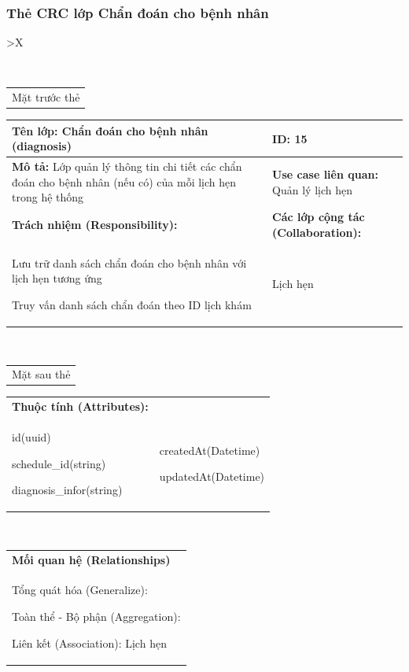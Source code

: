 \subsubsection{Thẻ CRC lớp Chẩn đoán cho bệnh nhân}

\begin{xltabular}{\textwidth}{
		>{\centering\arraybackslash}X
	}
	\caption{\bfseries \fontsize{12pt}{0pt}\selectfont Thẻ CRC lớp Chẩn đoán cho bệnh nhân}
	\\
	\begin{tabularx}{0.9\textwidth}{X}
		Mặt trước thẻ
	\end{tabularx}
	\begin{tabularx}{0.9\textwidth}{|X|X|}
		\hline
		\textbf{Tên lớp:} Chẩn đoán cho bệnh nhân (diagnosis)                                                               & \textbf{ID:} 15                                \\
		\hline
		\textbf{Mô tả:} Lớp quản lý thông tin chi tiết các chẩn đoán cho bệnh nhân (nếu có) của mỗi lịch hẹn trong hệ thống & \textbf{Use case liên quan:}  Quản lý lịch hẹn \\
		\hline
		\textbf{Trách nhiệm (Responsibility):}                                                                              & \textbf{Các lớp cộng tác (Collaboration):}     \\
		Lưu trữ danh sách chẩn đoán cho bệnh nhân với lịch hẹn tương ứng

		Truy vấn danh sách chẩn đoán theo ID lịch khám
		                                                                                                                    &
		Lịch hẹn
		\\
		\hline
	\end{tabularx}
	\\
	\begin{tabularx}{0.9\textwidth}{X}
		Mặt sau thẻ
	\end{tabularx}
	\begin{tabularx}{0.9\textwidth}{|X|X|}
		\hline
		\textbf{Thuộc tính (Attributes):} & \\
		id(uuid)

		schedule\_id(string)

		diagnosis\_infor(string)
		                                  &
		createdAt(Datetime)

		updatedAt(Datetime)
		\\ \hline
	\end{tabularx}
	\\
	\begin{tabularx}{0.9\textwidth}{|X|}
		\hline
		\textbf{Mối quan hệ (Relationships)} \\
		Tổng quát hóa (Generalize):

		Toàn thể - Bộ phận (Aggregation):

		Liên kết (Association): Lịch hẹn
		\\
		\hline
	\end{tabularx}
\end{xltabular}


